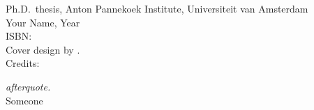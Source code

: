
\cleardoublepage
\thispagestyle{empty}
{\raggedright
  \small
  \noindent Ph.D.~thesis, Anton Pannekoek Institute, Universiteit van Amsterdam\\
  \noindent Your Name, Year\\[3ex]

  \noindent ISBN:  \\[3ex]


  \noindent Cover design by .\\
  \noindent Credits:
  
}



\cleardoublepage
\thispagestyle{empty}
\null\vfill\null

\hfill\parbox{125mm}{ 
\raggedleft\emph{\large afterquote.}\\[5pt]
Someone 
}
\vfill
\clearpage
\thispagestyle{empty}
\newpage
\phantom{let's kill those trees}


\pagestyle{fancy}

